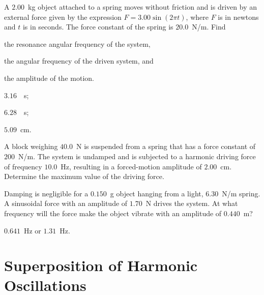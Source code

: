 \begin{problem}
	A $2.00$~kg object attached to a spring moves without friction and is driven by an external force given by the expression $F = 3.00\sin(2\pi t)$, where $F$ is in newtons and $t$ is in seconds. The force constant of the spring is $20.0$~N/m. Find 
	\begin{enumerate*}[label=(\alph*)]
		\item the resonance angular frequency of the system,
		\item the angular frequency of the driven system,
		and
		\item the amplitude of the motion.
	\end{enumerate*}
	\begin{solution}
		\begin{enumerate*}[label=(\alph*)]
			\item $3.16$~\si{\per\second}; 
			\item $6.28$~\si{\per\second};
			\item $5.09$~cm.
		\end{enumerate*}
	\end{solution}
\end{problem}


\begin{problem}
	A block weighing $40.0$~N is suspended from a spring that has a force constant of $200$~N/m. The system is undamped and is subjected to a harmonic driving force of frequency $10.0$~Hz, resulting in a forced-motion amplitude of $2.00$~cm. Determine the maximum value of the driving force.
\end{problem}


\begin{problem}
	Damping is negligible for a $0.150$~g object hanging from a light, $6.30$~N/m spring. A sinusoidal force with an amplitude of $1.70$~N drives the system. At what frequency will the force make the object vibrate with an amplitude of $0.440$~m?
	\begin{solution}
		$0.641$~Hz or $1.31$~Hz.
	\end{solution}
\end{problem}

\section{Superposition of Harmonic Oscillations}

